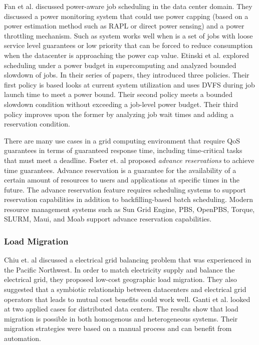 Fan et al. \cite{PowerAwareServer1} discussed power-aware job scheduling in the
data center domain.  They discussed a power monitoring system that could use
power capping (based on a power estimation method such as RAPL or direct power
sensing) and a power throttling mechanism. Such as system works well when is a
set of jobs with loose service level guarantees or low priority that can be
forced to reduce consumption when the datacenter is approaching the power cap
value. Etinski et al. \cite{Etinski1,Etinski2,Etinski3,Etinski4} explored
scheduling under a power budget in supercomputing and analyzed bounded slowdown
of jobs. In their series of papers, they introduced three policies. Their first
policy is based looks at current system utilization and uses DVFS during job
launch time to meet a power bound. Their second policy meets a bounded slowdown
condition without exceeding a job-level power budget. Their third policy
improves upon the former by analyzing job wait times and adding a reservation
condition.  

There are many use cases in a grid computing environment that require QoS
guarantees in terms of guaranteed response time, including time-critical tasks
that must meet a deadline. Foster et. al
\cite{foster_distributed_1999,foster_anatomy_2001} proposed \emph{advance
reservations} to achieve time guarantees. Advance reservation is a guarantee for
the availability of a certain amount of resources to users and applications at
specific times in the future. The advance reservation feature requires
scheduling systems to support reservation capabilities in addition to
backfilling-based batch scheduling. Modern resource management systems such as
Sun Grid Engine, PBS, OpenPBS, Torque, SLURM, Maui, and Moab support advance
reservation capabilities.

\subsubsection{Load Migration}
Chiu et. al \cite{chiu_electric_2012} discussed a electrical grid balancing
problem that was experienced in the Pacific Northwest. In order to match
electricity supply and balance the electrical grid, they proposed low-cost
geographic load migration. They also suggested that a symbiotic relationship
between datacenters and electrical grid operators that leads to mutual cost
benefits could work well.  Ganti et al. \cite{Ghatikar2012b} looked at two
applied cases for distributed data centers. The results show that load migration
is possible in both homogenous and heterogeneous systems. Their migration
strategies were based on a manual process and can benefit from automation.

